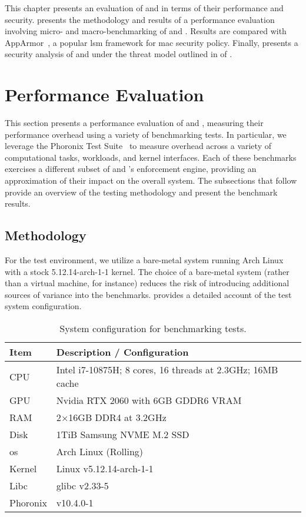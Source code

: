 This chapter presents an evaluation of \bpfbox{} and \bpfcontain{} in terms of their
performance and security.  presents the methodology and results
of a performance evaluation involving micro- and macro-benchmarking of \bpfbox{} and
\bpfcontain{}. Results are compared with AppArmor~\cite{cowan2000_apparmor}, a popular
\gls{lsm} framework for \gls{mac} security policy. Finally, 
presents a security analysis of \bpfbox{} and \bpfcontain{} under the threat model
outlined in  of .

\section{Performance Evaluation}%
\label{s:eval-performance}

This section presents a performance evaluation of \bpfbox{} and \bpfcontain{}, measuring
their performance overhead using a variety of benchmarking tests. In particular, we
leverage the Phoronix Test Suite~\cite{phoronix} to measure overhead across a variety of
computational tasks, workloads, and kernel interfaces. Each of these benchmarks exercises
a different subset of \bpfbox{} and \bpfcontain{}'s enforcement engine, providing an
approximation of their impact on the overall system. The subsections that follow provide
an overview of the testing methodology and present the benchmark results.

\subsection{Methodology}%
\label{ss:eval-methodology}

For the test environment, we utilize a bare-metal system running Arch Linux with a stock
5.12.14-arch-1-1 kernel. The choice of a bare-metal system (rather than a virtual machine,
for instance) reduces the risk of introducing additional sources of variance into the
benchmarks.  provides a detailed account of the test system
configuration.

\begin{table}[htpb]
  \centering
  \caption[System configuration for benchmarking tests]{System configuration for benchmarking tests.}%
  \label{tab:system-config}
  \begin{tabular}{ll}
  \toprule
  Item & Description / Configuration \\
  \midrule
  CPU & Intel i7-10875H; 8 cores, 16 threads at 2.3GHz; 16MB cache\\
  GPU & Nvidia RTX 2060 with 6GB GDDR6 VRAM \\
  RAM & 2$\times$16GB DDR4 at 3.2GHz \\
  Disk & 1TiB Samsung NVME M.2 SSD \\
  \midrule
  \gls{os} & Arch Linux (Rolling) \\
  Kernel & Linux v5.12.14-arch-1-1 \\
  Libc & glibc v2.33-5 \\
  Phoronix & v10.4.0-1 \\
  \bottomrule
  \end{tabular}
\end{table}

